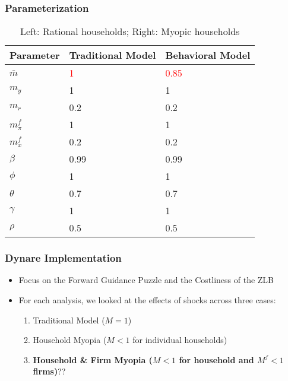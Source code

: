 \documentclass{beamer}
\begin{document}

\begin{frame}
	\frametitle{Parameterization}
\begin{table}
	\begin{tabular}{l l l}
		\toprule
		\textbf{Parameter} & \textbf{Traditional Model} & \textbf{Behavioral Model}\\
		\midrule
		$\bar{m}$ & \textcolor{red}{1} & \textcolor{red}{0.85} \\
		$m_{y}$ & 1 & 1 \\
		$m_{r}$ & 0.2 & 0.2\\
		$m^{f}_{\pi}$ & 1 & 1 \\
		$m^{f}_{x}$  & 0.2 & 0.2 \\
		\hline
		\hline
		$\beta$ & 0.99 & 0.99 \\
		$\phi$ & 1 & 1 \\
		$\theta$ & 0.7 & 0.7 \\
		$\gamma$ & 1 & 1 \\
		$\rho$	& 0.5 & 0.5\\
		\bottomrule
	\end{tabular}
	\caption{Left: Rational households; Right: Myopic households}
\end{table}
\end{frame}

\begin{frame}
	\frametitle{Dynare Implementation}
	\begin{itemize}
		\item Focus on the Forward Guidance Puzzle and the Costliness of the ZLB
		\vspace{8pt}
		\item For each analysis, we looked at the effects of shocks across three cases:
		\vspace{8pt}
		\begin{enumerate}
			\item Traditional Model ($M = 1$)
			\item Household Myopia ($M < 1$ for individual households)
			\item \textbf{Household \& Firm Myopia ($M<1$ for household and $M^{f}<1$ firms)}??
		\end{enumerate}
	\end{itemize}
\end{frame}

\end{document}
